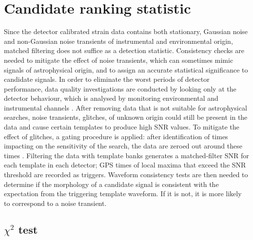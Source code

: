 \documentclass[binding=0.6cm, LaM]{sapthesis}
\begin{document}
\section{Candidate ranking statistic}

 	Since the detector calibrated strain data contains both stationary, Gaussian noise
        and non-Gaussian noise transients of instrumental and environmental origin,
        matched filtering does not suffice as a detection statistic.
        Consistency checks are needed to mitigate the effect of noise transients,
        which can sometimes mimic signals of astrophysical origin,
        and to assign an accurate statistical significance to candidate signals.
        In order to eliminate the worst periods of detector performance, 
        data quality investigations are conducted by looking only at the detector behaviour,  
        which is analysed by monitoring environmental and instrumental channels \cite{40}.
        After removing data that is not suitable for astrophysical searches, 
        noise transients, glitches, of unknown origin could still be present in the data 
        and cause certain templates to produce high SNR values.
        To mitigate the effect of glitches, a gating procedure is applied:
        after identification of times impacting on the sensitivity of the search,
        the data are zeroed out around these times \cite{42}.
        Filtering the data with template banks generates a matched-filter SNR for each template in each detector;
        GPS times of local maxima that exceed the SNR threshold are recorded as triggers. 
        Waveform consistency tests are then needed to determine if the morphology 
        of a candidate signal is consistent with the expectation from the triggering template waveform.  If it is not,
        it is more likely to correspond to a noise transient.
	
\subsection{$\chi^2$ test}
\end{document}
